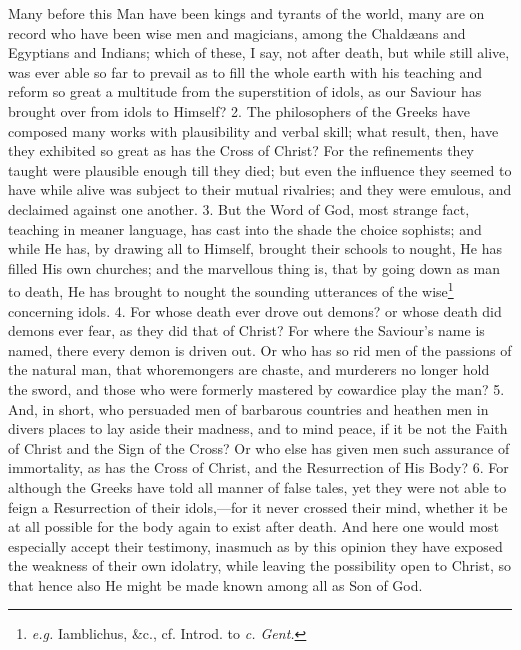 Many before this Man have been kings and tyrants of the world, many are on record who have been wise men and magicians, among the Chaldæans and Egyptians and Indians; which of these, I say, not after death, but while still alive, was ever able so far to prevail as to fill the whole earth with his teaching and reform so great a multitude from the superstition of idols, as our Saviour has brought over from idols to Himself? 2. The philosophers of the Greeks have composed many works with plausibility and verbal skill; what result, then, have they exhibited so great as has the Cross of Christ? For the refinements they taught were plausible enough till they died; but even the influence they seemed to have while alive was subject to their mutual rivalries; and they were emulous, and declaimed against one another. 3. But the Word of God, most strange fact, teaching in meaner language, has cast into the shade the choice sophists; and while He has, by drawing all to Himself, brought their schools to nought, He has filled His own churches; and the marvellous thing is, that by going down as man to death, He has brought to nought the sounding utterances of the wise\footnote{\emph{e.g.} Iamblichus, \&c., cf. Introd. to \emph{c. Gent.}} concerning idols. 4. For whose death ever drove out demons? or whose death did demons ever fear, as they did that of Christ? For where the Saviour’s name is named, there every demon is driven out. Or who has so rid men of the passions of the natural man, that whoremongers are chaste, and murderers no longer hold the sword, and those who were formerly mastered by cowardice play the man? 5. And, in short, who persuaded men of barbarous countries and heathen men in divers places to lay aside their madness, and to mind peace, if it be not the Faith of Christ and the Sign of the Cross? Or who else has given men such assurance of immortality, as has the Cross of Christ, and the Resurrection of His Body? 6. For although the Greeks have told all manner of false tales, yet they were not able to feign a Resurrection of their idols,—for it never crossed their mind, whether it be at all possible for the body again to exist after death. And here one would most especially accept their testimony, inasmuch as by this opinion they have exposed the weakness of their own idolatry, while leaving the possibility open to Christ, so that hence also He might be made known among all as Son of God.


